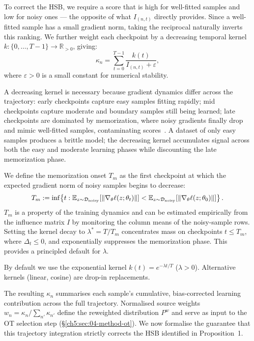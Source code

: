 \begin{foldable} %
	To correct the HSB, we require a score that is high for well-fitted samples and low for noisy ones --- the opposite of what $I_{(n,t)}$ directly provides.
	Since a well-fitted sample has a small gradient norm, taking the reciprocal naturally inverts this ranking.
	We further weight each checkpoint by a decreasing temporal kernel $k : \{0,\ldots,T-1\} \to \mathbb{R}_{>0}$, giving:
	\begin{equation}
		\kappa_n = \sum_{t=0}^{T-1} \frac{k(t)}{I_{(n,t)} + \varepsilon},
		\label{ch5:eq:kappa}
	\end{equation}
	where $\varepsilon > 0$ is a small constant for numerical stability.

	A decreasing kernel is necessary because gradient dynamics differ across the trajectory: early checkpoints capture easy samples fitting rapidly; mid checkpoints capture moderate and boundary samples still being learned; late checkpoints are dominated by memorization, where noisy gradients finally drop and mimic well-fitted samples, contaminating scores~\cite{arpit2017closer}.
	A dataset of only easy samples produces a brittle model; the decreasing kernel accumulates signal across both the easy and moderate learning phases while discounting the late memorization phase.

	We define the memorization onset $T_m$ as the first checkpoint at which the expected gradient norm of noisy samples begins to decrease:
	\begin{equation}
		T_m := \inf\!\left\{t : \mathbb{E}_{z \sim \mathcal{D}_\textup{noisy}}\!\left[\|\nabla_\theta \ell(z;\theta_t)\|\right] < \mathbb{E}_{z \sim \mathcal{D}_\textup{noisy}}\!\left[\|\nabla_\theta \ell(z;\theta_0)\|\right]\right\}.
		\label{ch5:eq:Tm}
	\end{equation}
	$T_m$ is a property of the training dynamics and can be estimated empirically from the influence matrix $I$ by monitoring the column means of the noisy-sample rows.
	Setting the kernel decay to $\lambda^* = T / T_m$ concentrates mass on checkpoints $t \leq T_m$, where $\Delta_t \leq 0$, and exponentially suppresses the memorization phase.
	This provides a principled default for $\lambda$.

	By default we use the exponential kernel $k(t) = e^{-\lambda t / T}$ ($\lambda > 0$).
	Alternative kernels (linear, cosine) are drop-in replacements.

	The resulting $\kappa_n$ summarises each sample's cumulative, bias-corrected learning contribution across the full trajectory.
	Normalised source weights $w_n = \kappa_n / \sum_{n'} \kappa_{n'}$ define the reweighted distribution $P^w$ and serve as input to the OT selection step (\S\ref{ch5:sec:04-method-ot}).
	We now formalise the guarantee that this trajectory integration strictly corrects the HSB identified in Proposition~1.


\end{foldable}
